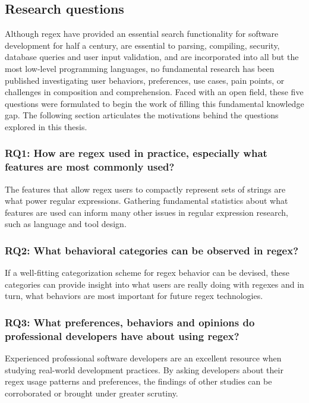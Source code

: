 \subsection{Research questions}

Although regex have provided an essential search functionality for software development for half a century, are essential to parsing, compiling, security, database queries and user input validation, and are incorporated into all but the most low-level programming languages, no fundamental research has been published investigating user behaviors, preferences, use cases, pain points, or challenges in composition and comprehension.  Faced with an open field, these five questions were formulated to begin the work of filling this fundamental knowledge gap.  The following section articulates the motivations behind the questions explored in this thesis.

\subsubsection{RQ1: How are regex used in practice, especially what features are most commonly used?}

The features that allow regex users to compactly represent sets of strings are what power regular expressions.  Gathering fundamental statistics about what features are used can inform many other issues in regular expression research, such as language and tool design.

\subsubsection{RQ2: What behavioral categories can be observed in regex?}

If a well-fitting categorization scheme for regex behavior can be devised, these categories can provide insight into what users are really doing with regexes and in turn, what behaviors are most important for future regex technologies.

\subsubsection{RQ3: What preferences, behaviors and opinions do professional developers have about using regex?}

Experienced professional software developers are an excellent resource when studying real-world development practices.  By asking developers about their regex usage patterns and preferences, the findings of other studies can be corroborated or brought under greater scrutiny.


